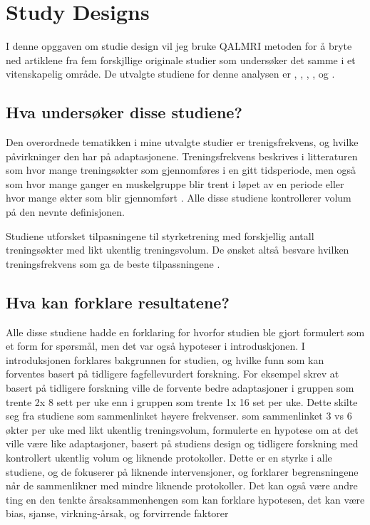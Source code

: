 \documentclass[
]{book}
\begin{document}
\hypertarget{study-designs}{%
\chapter{\texorpdfstring{\textbf{Study Designs}}{Study Designs}}\label{study-designs}}

I denne opggaven om studie design vil jeg bruke QALMRI metoden \citep{brosowsky2020} for å bryte ned artiklene fra fem forskjllige originale studier som undersøker det samme i et vitenskapelig område. De utvalgte studiene for denne analysen er \citep{johnsen2021}, \citep{brigatto2019}, \citep{gentil2018}, \citep{saric2019}, og \citep{lasevicius2019}.

\hypertarget{hva-undersuxf8ker-disse-studiene}{%
\section{Hva undersøker disse studiene?}\label{hva-undersuxf8ker-disse-studiene}}

Den overordnede tematikken i mine utvalgte studier er trenigsfrekvens, og hvilke påvirkninger den har på adaptasjonene. Treningsfrekvens beskrives i litteraturen som hvor mange treningsøkter som gjennomføres i en gitt tidsperiode, men også som hvor mange ganger en muskelgruppe blir trent i løpet av en periode eller hvor mange økter som blir gjennomført \citep{kraemer2004, schoenfeld2016}. Alle disse studiene kontrollerer volum på den nevnte definisjonen.

Studiene utforsket tilpasningene til styrketrening med forskjellig antall treningsøkter med likt ukentlig treningsvolum. De ønsket altså besvare hvilken treningsfrekvens som ga de beste tilpassningene \citep{johnsen2021, brigatto2019, gentil2018, saric2019, lasevicius2019}.

\hypertarget{hva-kan-forklare-resultatene}{%
\section{Hva kan forklare resultatene?}\label{hva-kan-forklare-resultatene}}

Alle disse studiene hadde en forklaring for hvorfor studien ble gjort formulert som et form for spørsmål, men det var også hypoteser i introduskjonen. I introduksjonen forklares bakgrunnen for studien, og hvilke funn som kan forventes basert på tidligere fagfellevurdert forskning. For eksempel skrev \citep{brigatto2019} at basert på tidligere forskning ville de forvente bedre adaptasjoner i gruppen som trente 2x 8 sett per uke enn i gruppen som trente 1x 16 set per uke. Dette skilte seg fra studiene som sammenlinket høyere frekvenser. \citep{saric2019} som sammenlinket 3 vs 6 økter per uke med likt ukentlig treningsvolum, formulerte en hypotese om at det ville være like adaptasjoner, basert på studiens design og tidligere forskning med kontrollert ukentlig volum og liknende protokoller. Dette er en styrke i alle studiene, og de fokuserer på liknende intervensjoner, og forklarer begrensningene når de sammenlikner med mindre liknende protokoller. Det kan også være andre ting en den tenkte årsaksammenhengen som kan forklare hypotesen, det kan være bias, sjanse, virkning-årsak, og forvirrende faktorer \citep{hulley_2013}
\end{document}
